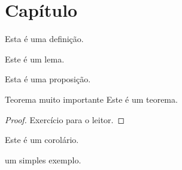 \chapter{Capítulo}

\begin{df}[]{}{}
Esta é uma definição.
\end{df}

\begin{lema}[]{}{}
Este é um lema.
\end{lema}

\begin{prop}[]{}{}
Esta é uma proposição.
\end{prop}

\begin{teo}[]{Teorema muito importante}{}
Este é um teorema.
\end{teo}

\begin{proof}
Exercício para o leitor.
\end{proof}

\begin{coro}[]{}{}
Este é um corolário.
\end{coro}

\begin{ex}
um simples exemplo.
\end{ex}
